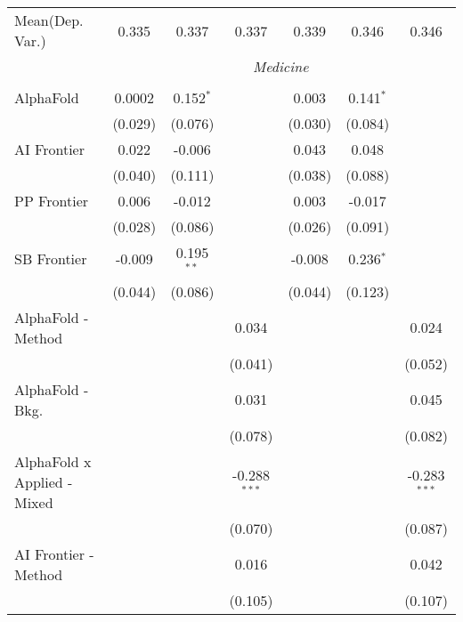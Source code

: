 \begin{tabular}{lcccccc}
Mean(Dep. Var.) & 0.335 & 0.337 & 0.337 & 0.339 & 0.346 & 0.346 \\
 & \multicolumn{6}{c}{\textit{Medicine}} \\ \\
   AlphaFold                   & 0.0002  & 0.152$^{*}$  &                & 0.003   & 0.141$^{*}$ &   \\   
                               & (0.029) & (0.076)      &                & (0.030) & (0.084)     &   \\   
   AI Frontier                 & 0.022   & -0.006       &                & 0.043   & 0.048       &   \\   
                               & (0.040) & (0.111)      &                & (0.038) & (0.088)     &   \\   
   PP Frontier                 & 0.006   & -0.012       &                & 0.003   & -0.017      &   \\   
                               & (0.028) & (0.086)      &                & (0.026) & (0.091)     &   \\   
   SB Frontier                 & -0.009  & 0.195$^{**}$ &                & -0.008  & 0.236$^{*}$ &   \\   
                               & (0.044) & (0.086)      &                & (0.044) & (0.123)     &   \\   
   AlphaFold - Method          &         &              & 0.034          &         &             & 0.024\\   
                               &         &              & (0.041)        &         &             & (0.052)\\   
   AlphaFold - Bkg.            &         &              & 0.031          &         &             & 0.045\\   
                               &         &              & (0.078)        &         &             & (0.082)\\   
   AlphaFold x Applied - Mixed &         &              & -0.288$^{***}$ &         &             & -0.283$^{***}$\\   
                               &         &              & (0.070)        &         &             & (0.087)\\   
   AI Frontier - Method        &         &              & 0.016          &         &             & 0.042\\   
                               &         &              & (0.105)        &         &             & (0.107)\\   

\end{tabular}
